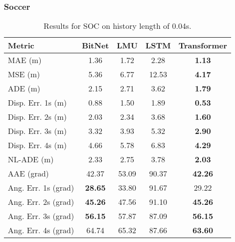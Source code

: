 \subsubsection{Soccer}

\begin{table}[H]
\centering
\caption{Results for SOC on history length of 0.04s.}
\label{hist:SOC_0.04s}
\begin{tabular}{l||c|c|c|c}
Metric & BitNet & LMU & LSTM & Transformer \\
\hline \hline 
MAE (m) & 1.36 & 1.72 & 2.28 & \textbf{1.13} \\
MSE (m) & 5.36 & 6.77 & 12.53 & \textbf{4.17} \\
ADE (m) & 2.15 & 2.71 & 3.62 & \textbf{1.79} \\
Disp. Err. 1s (m) & 0.88 & 1.50 & 1.89 & \textbf{0.53} \\
Disp. Err. 2s (m) & 2.03 & 2.34 & 3.68 & \textbf{1.60} \\
Disp. Err. 3s (m) & 3.32 & 3.93 & 5.32 & \textbf{2.90} \\
Disp. Err. 4s (m) & 4.66 & 5.78 & 6.83 & \textbf{4.29} \\
NL-ADE (m) & 2.33 & 2.75 & 3.78 & \textbf{2.03} \\
AAE (grad) & 42.37 & 53.09 & 90.37 & \textbf{42.26} \\
Ang. Err. 1s (grad) & \textbf{28.65} & 33.80 & 91.67 & 29.22 \\
Ang. Err. 2s (grad) & \textbf{45.26} & 47.56 & 91.10 & \textbf{45.26} \\
Ang. Err. 3s (grad) & \textbf{56.15} & 57.87 & 87.09 & \textbf{56.15} \\
Ang. Err. 4s (grad) & 64.74 & 65.32 & 87.66 & \textbf{63.60} \\
\end{tabular}
\end{table}


